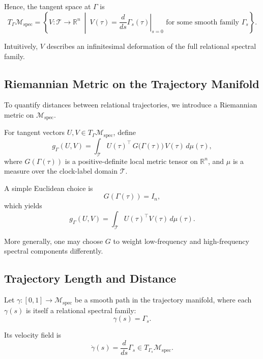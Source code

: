 \documentclass[11pt,a4paper]{article}
\theoremstyle{definition}
\theoremstyle{remark}
\begin{document}
Hence, the tangent space at $\Gamma$ is
\begin{equation}
T_{\Gamma}\mathcal{M}_{\mathrm{spec}}
=
\left\{
V : \mathcal{T} \to \mathbb{R}^n
\ \middle|\
V(\tau)=\left.\frac{d}{ds}\Gamma_s(\tau)\right|_{s=0}
\text{ for some smooth family } \Gamma_s
\right\}.
\end{equation}

Intuitively, $V$ describes an infinitesimal deformation of the full relational spectral family.

\subsection{Riemannian Metric on the Trajectory Manifold}

To quantify distances between relational trajectories, we introduce a Riemannian metric on $\mathcal{M}_{\mathrm{spec}}$.

For tangent vectors $U, V \in T_{\Gamma}\mathcal{M}_{\mathrm{spec}}$, define
\begin{equation}
g_{\Gamma}(U,V)
=
\int_{\mathcal{T}}
U(\tau)^{\top}
\, G\!\bigl(\Gamma(\tau)\bigr)\,
V(\tau)
\, d\mu(\tau),
\end{equation}
where $G(\Gamma(\tau))$ is a positive-definite local metric tensor on $\mathbb{R}^n$, and $\mu$ is a measure over the clock-label domain $\mathcal{T}$.

A simple Euclidean choice is
\begin{equation}
G(\Gamma(\tau)) = I_n,
\end{equation}
which yields
\begin{equation}
g_{\Gamma}(U,V)
=
\int_{\mathcal{T}}
U(\tau)^{\top} V(\tau)\, d\mu(\tau).
\end{equation}

More generally, one may choose $G$ to weight low-frequency and high-frequency spectral components differently.

\subsection{Trajectory Length and Distance}

Let $\gamma : [0,1] \to \mathcal{M}_{\mathrm{spec}}$ be a smooth path in the trajectory manifold, where each $\gamma(s)$ is itself a relational spectral family:
\begin{equation}
\gamma(s) = \Gamma_s.
\end{equation}

Its velocity field is
\begin{equation}
\dot{\gamma}(s) = \frac{d}{ds}\Gamma_s \in T_{\Gamma_s}\mathcal{M}_{\mathrm{spec}}.
\end{equation}
\end{document}
